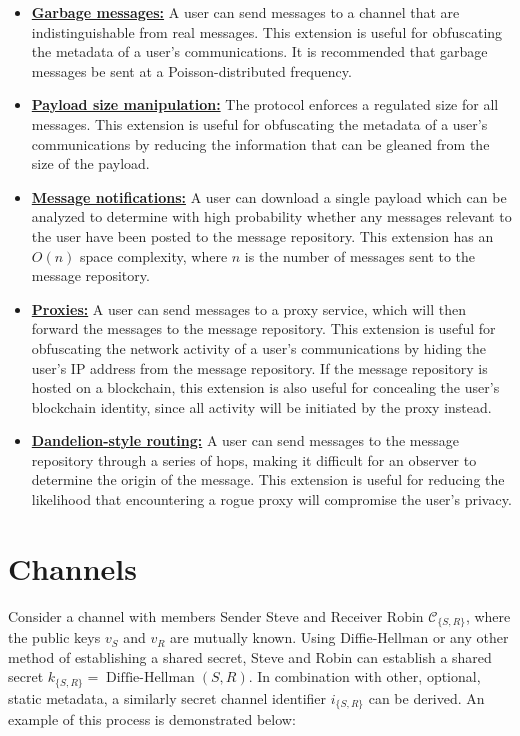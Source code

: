 \begin{itemize}
\item
    \hyperref[garbage-messages]{\textbf{Garbage messages:}} A user can send messages to a channel that are indistinguishable from real messages. This extension is useful for obfuscating the metadata of a user's communications. It is recommended that garbage messages be sent at a Poisson-distributed frequency.
\item
    \hyperref[payload-size]{\textbf{Payload size manipulation:}} The protocol enforces a regulated size for all messages. This extension is useful for obfuscating the metadata of a user's communications by reducing the information that can be gleaned from the size of the payload.
\item
    \hyperref[message-notifications]{\textbf{Message notifications:}} A user can download a single payload which can be analyzed to determine with high probability whether any messages relevant to the user have been posted to the message repository. This extension has an $O(n)$ space complexity, where $n$ is the number of messages sent to the message repository.
\item
    \hyperref[proxies]{\textbf{Proxies:}} A user can send messages to a proxy service, which will then forward the messages to the message repository. This extension is useful for obfuscating the network activity of a user's communications by hiding the user's IP address from the message repository. If the message repository is hosted on a blockchain, this extension is also useful for concealing the user's blockchain identity, since all activity will be initiated by the proxy instead.
\item
    \hyperref[dandelion-style-routing]{\textbf{Dandelion-style routing:}} A user can send messages to the message repository through a series of hops, making it difficult for an observer to determine the origin of the message. This extension is useful for reducing the likelihood that encountering a rogue proxy will compromise the user's privacy.
\end{itemize}

\section{Channels}\label{channels}

Consider a channel with members Sender Steve and Receiver Robin $\mathcal{C}_{\{S,R\}}$, where the public keys $v_S$ and $v_R$ are mutually known. Using Diffie-Hellman or any other method of establishing a shared secret, Steve and Robin can establish a shared secret $k_{\{S,R\}} = \operatorname{Diffie-Hellman}(S, R)$. In combination with other, optional, static metadata, a similarly secret channel identifier $i_{\{S,R\}}$ can be derived. An example of this process is demonstrated below:

